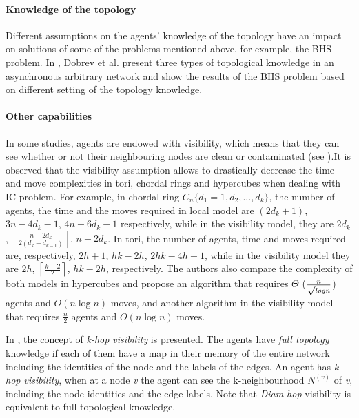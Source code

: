 \paragraph{Knowledge of the topology} 
Different assumptions on the agents' knowledge of the topology have an impact on solutions of some of the problems mentioned above, for example, the BHS problem. In \cite{dobr}, Dobrev et al. present three types of topological knowledge in an asynchronous arbitrary network and show the results of the BHS problem based on different setting of the topology knowledge.

\paragraph{Other capabilities}
In some studies, agents are endowed with   visibility, which means that they can see whether or not their neighbouring nodes are clean or contaminated (see \cite{mhuang, mhuang1}).It is observed that the visibility assumption allows   to drastically decrease the time and move complexities in tori, chordal rings and hypercubes when dealing with IC problem. For example, in chordal ring $C_n\{d_1=1,d_2,...,d_k\}$, the number of agents, the time and the moves required in local model are $(2d_k+1)$, $3n-4d_k-1$, $4n-6d_k-1$ respectively, while in the visibility model, they are $2d_k$, $\left \lceil \frac{n-2d_{k}}{2(d_{k}-d_{k-1})} \right \rceil$, $n-2d_k$. In tori, the number of agents,   time and   moves required are, respectively,  $2h+1$, $hk-2h$, $2hk-4h-1$, while  in the  visibility model they are $2h$, $\left \lceil \frac{k-2}{2} \right \rceil$, $hk-2h$, respectively. The authors also compare the complexity of both models in hypercubes  and propose an algorithm that requires $\Theta$  ($n \over { \sqrt {log n}} $) agents and $O(n \log n)$ moves, and another algorithm   in the visibility model that requires $\frac{n}{2}$ agents and $O(n \log n)$ moves.

In \cite{cai3}, the concept of {\em k-hop visibility} is presented. The agents have   {\em full topology} knowledge if each of them have a map in their memory  of the entire network including the identities of the node and the labels of the edges. An agent has {\em k-hop visibility}, when at a node {\em v} the agent can see the k-neighbourhood $N^{(v)}$ of {\em v}, including the node identities and the edge labels. Note that {\em Diam-hop} visibility is equivalent to full topological knowledge. 

